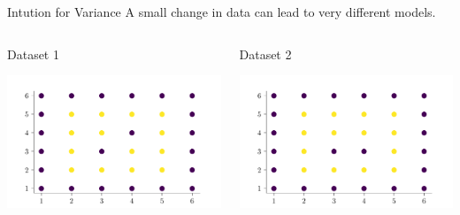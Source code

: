 \documentclass{beamer}
\begin{document}
\begin{frame}{Intution for Variance}
A small change in data can lead to very different models.\\
\vspace{1cm}
\begin{columns}
\begin{column}{0.5\textwidth}{\hspace{1.75cm} Dataset 1}
\begin{center}
\includegraphics[width = \textwidth]{../figures/decision-trees/bias-variance-dataset-2.pdf}
\end{center}
\end{column}
\begin{column}{0.5\textwidth}{\hspace{1.75cm} Dataset 2}
\begin{center}
\includegraphics[width = \textwidth]{../figures/decision-trees/bias-variance-dataset-2-2.pdf}
\end{center}
\end{column}
\end{columns}
\end{frame}
\end{document}
